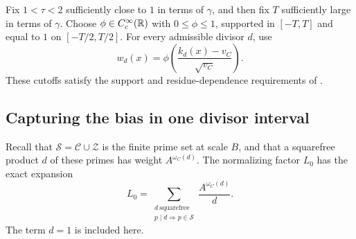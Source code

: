 Fix $1<\tau<2$ sufficiently close to $1$ in terms of $\gamma$, and then
fix $T$ sufficiently large in terms of $\gamma$. Choose
$\phi\in C_c^\infty(\mathbb R)$ with $0\le\phi\le1$, supported in $[-T,T]$
and equal to $1$ on $[-T/2,T/2]$. For every admissible divisor $d$, use
\begin{equation}\label{eq:analytic-cutoffs}
 w_d(x)=\phi\left(\frac{k_d(x)-v_C}{\sqrt{v_C}}\right).
\end{equation}
These cutoffs satisfy the support and residue-dependence requirements
of .

\subsection{Capturing the bias in one divisor interval}

Recall that $\mathcal S=\mathcal C\cup\mathcal Z$ is the finite prime set
at scale $B$, and that a squarefree product $d$ of these primes has
weight $A^{\omega_C(d)}$. The normalizing factor $L_0$ has the exact
expansion
\begin{equation}\label{eq:raw-divisor-law}
 L_0=\sum_{\substack{d\ \mathrm{squarefree}\\p\mid d\Rightarrow p\in\mathcal S}}
       \frac{A^{\omega_C(d)}}d.
\end{equation}
The term $d=1$ is included here.

